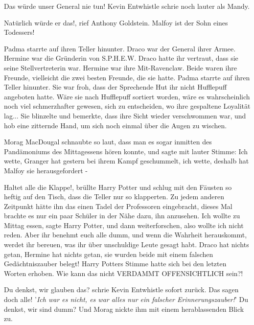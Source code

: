 \glqq{}Das würde unser General nie tun!\grqq{} Kevin Entwhistle schrie noch
lauter als Mandy.

\glqq{}Natürlich würde er das!\grqq{}, rief Anthony Goldstein. \glqq{}Malfoy ist
der Sohn eines Todessers!\grqq{}

Padma starrte auf ihren Teller hinunter. Draco war der General ihrer Armee.
Hermine war die Gründerin von S.P.H.E.W. Draco hatte ihr vertraut, dass sie
seine Stellvertreterin war. Hermine war ihre Mit-Ravenclaw. Beide waren ihre
Freunde, vielleicht die zwei besten Freunde, die sie hatte. Padma starrte auf
ihren Teller hinunter. Sie war froh, dass der Sprechende Hut ihr nicht
Hufflepuff angeboten hatte. Wäre sie nach Hufflepuff sortiert worden, wäre es
wahrscheinlich noch viel schmerzhafter gewesen, sich zu entscheiden, wo ihre
gespaltene Loyalität lag... Sie blinzelte und bemerkte, dass ihre Sicht wieder
verschwommen war, und hob eine zitternde Hand, um sich noch einmal über die
Augen zu wischen.

Morag MacDougal schnaubte so laut, dass man es sogar inmitten des Pandämoniums
des Mittagessens hören konnte, und sagte mit lauter Stimme: \glqq{}Ich wette,
Granger hat gestern bei ihrem Kampf geschummelt, ich wette, deshalb hat Malfoy
sie herausgefordert -\grqq{}

\glqq{}Haltet alle die Klappe!\grqq{}, brüllte Harry Potter und schlug mit den
Fäusten so heftig auf den Tisch, dass die Teller nur so klapperten. Zu jedem
anderen Zeitpunkt hätte ihn das einen Tadel der Professoren eingebracht, dieses
Mal brachte es nur ein paar Schüler in der Nähe dazu, ihn anzusehen. \glqq{}Ich
wollte zu Mittag essen\grqq{}, sagte Harry Potter, \glqq{}und dann
weiterforschen, also wollte ich nicht reden. Aber ihr benehmt euch alle dumm,
und wenn die Wahrheit herauskommt, werdet ihr bereuen, was ihr über unschuldige
Leute gesagt habt. Draco hat nichts getan, Hermine hat nichts getan, sie wurden
beide mit einem falschen Gedächtniszauber belegt!\grqq{} Harry Potters Stimme
hatte sich bei den letzten Worten erhoben. \glqq{}Wie kann das nicht VERDAMMT
OFFENSICHTLICH sein?!\grqq{}

\glqq{}Du denkst, wir glauben das?\grqq{} schrie Kevin Entwhistle sofort zurück.
\glqq{}Das sagen doch alle! '\emph{Ich war es nicht, es war alles nur ein
falscher Erinnerungszauber!}' Du denkst, wir sind dumm?\grqq{} Und Morag nickte
ihm mit einem herablassenden Blick zu.

